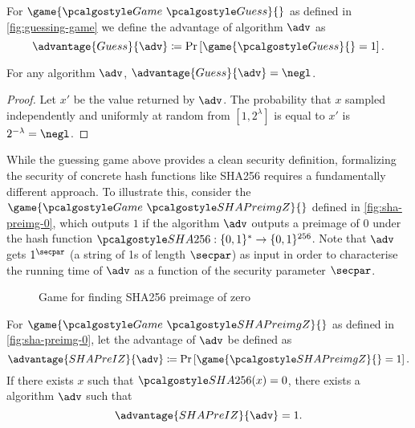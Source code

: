 \begin{definition}
  For $\game{\Game~\algo{Guess}}{}$ as defined in \autoref{fig:guessing-game} we define the advantage of algorithm $\adv$ as
 \[
  \advantage{Guess}{\adv} \defeq \pr{\game{\algo{Guess}}{} = 1}.
 \]
\end{definition}

\begin{proposition}\label{prop:guessing-game}
  For any algorithm $\adv$, $\advantage{Guess}{\adv} = \negl$.
\end{proposition}

\begin{proof}
Let $x'$ be the value returned by $\adv$.
The probability that $x$ sampled independently and uniformly at random from $[1, 2^\lambda]$ is equal to $x'$ is $2^{-\lambda} = \negl$.
\end{proof}

While the guessing game above provides a clean security definition, formalizing the security of concrete hash functions like SHA256 requires a fundamentally different approach.
To illustrate this, consider the $\game{\Game~\algo{SHAPreimgZ}}{}$ defined in \autoref{fig:sha-preimg-0}, which outputs $1$ if the algorithm $\adv$ outputs a preimage of 0 under the hash function $\algo{SHA256}: \{0, 1\}^* \rightarrow \{0, 1\}^{256}$.
Note that $\adv$ gets $1^{\secpar}$ (a string of 1s of length $\secpar$) as input in order to characterise the running time of $\adv$ as a function of the security parameter $\secpar$.

\begin{figure}[tbhp]
  \begin{center}
    \begin{tcolorbox}[width=5cm]
      \begin{pchstack}[center]
      \end{pchstack}
    \end{tcolorbox}
  \end{center}
  \caption{Game for finding SHA256 preimage of zero \label{fig:sha-preimg-0}}
\end{figure}

\begin{proposition}\label{prop:sha-preimg-z}
 For $\game{\Game~\algo{SHAPreimgZ}}{}$ as defined in \autoref{fig:sha-preimg-0}, let the advantage of $\adv$ be defined as
 \[
  \advantage{SHAPreIZ}{\adv} \defeq \pr{\game{\algo{SHAPreimgZ}}{} = 1}.
 \]
 If there exists $x$ such that $\algo{SHA256}(x) = 0$, there exists a \ppt algorithm $\adv$ such that
  \[
  \advantage{SHAPreIZ}{\adv} = 1.
  \]
\end{proposition}

